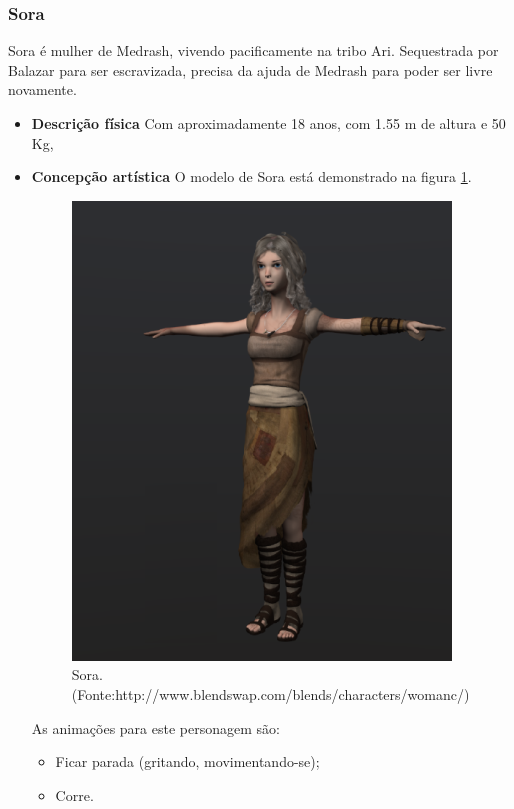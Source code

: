 \subsubsection{Sora}
Sora é mulher de Medrash, vivendo pacificamente na tribo Ari. Sequestrada
 por Balazar para ser escravizada, precisa da ajuda de Medrash para poder
 ser livre novamente.
\begin{itemize}
\item {\bf Descrição física}
Com aproximadamente 18 anos, com 1.55 m de altura e 50 Kg, 
\item {\bf Concepção artística}
O modelo de Sora está demonstrado na figura \ref{img:sora}.

\begin{figure}[H]
 \centering
 \includegraphics[scale=0.8]{Imagens/sora01.png}
 \caption{Sora.(Fonte:http://www.blendswap.com/blends/characters/womanc/)}
\label{img:sora}
\end{figure}


As animações para este personagem são:
\begin{itemize}
\item Ficar parada (gritando, movimentando-se);
\item Corre.
\end{itemize}
\end{itemize}


